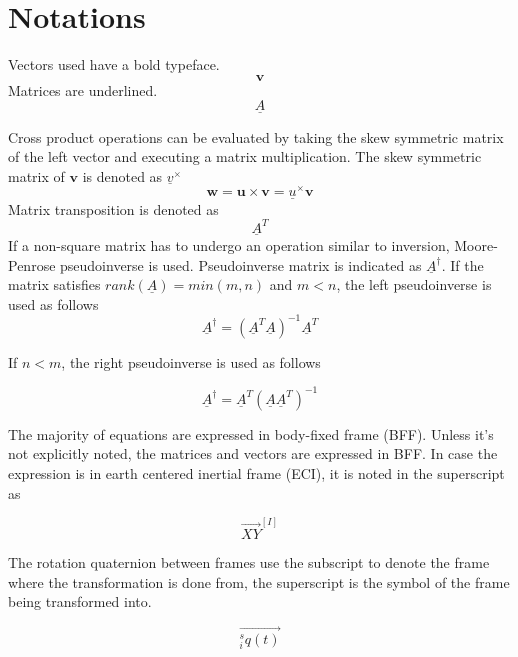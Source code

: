 \section*{Notations}

Vectors used have a bold typeface.  
\begin{equation*}
\textbf{v}
\end{equation*}
Matrices are underlined.
\begin{equation*}
\underline{A}
\end{equation*}

Cross product operations can be evaluated by taking the skew symmetric matrix of the left vector and executing a matrix multiplication. The skew symmetric matrix of $\textbf{v}$ is denoted as $\underline{v}^\times$
\begin{equation*}
	\textbf{w} = \textbf{u} \times \textbf{v} = \underline{u}^\times \textbf{v}
\end{equation*}
Matrix transposition is denoted as
\begin{equation*}
\underline{A}^T
\end{equation*}
If a non-square matrix has to undergo an operation similar to inversion, Moore-Penrose pseudoinverse is used. Pseudoinverse matrix is indicated as $\underline{A}^\dagger$. If the matrix satisfies $rank(\underline{A}) = min(m,n)$ and $m < n$, the left pseudoinverse is used as follows
\begin{equation*}
\underline{A}^\dagger    =   (\underline{A}^T \underline{A} )^{-1} \underline{A}^T 
\end{equation*}

If $n < m$, the right pseudoinverse is used as follows

\begin{equation*}
 \underline{A}^\dagger    =  \underline{A}^T  (\underline{A} \underline{A}^T)^{-1}
\end{equation*}


The majority of equations are expressed in body-fixed frame (BFF). Unless it's not explicitly noted, the matrices and vectors are expressed in BFF. In case the expression is in earth centered inertial frame (ECI), it is noted in the superscript as 

\begin{equation*}
\vec{XY}^{[I]}
\end{equation*}

The rotation quaternion between frames use the subscript to denote the frame where the transformation is done from, the superscript is the symbol of the frame being transformed into.

\begin{equation*}
\vec{^s_i q(t)}
\end{equation*}